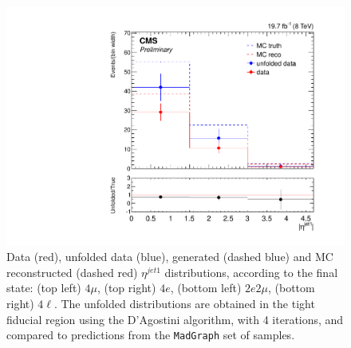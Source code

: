 \begin{figure}[hbtp]
\begin{center}
    \includegraphics[width=\cmsFigWidth]{Figures/EtaJet1_ZZTo4l_Mad_fr}       
    \caption{\footnotesize{Data (red), unfolded data (blue), generated (dashed blue) and MC reconstructed (dashed red) $\eta^{jet1}$ distributions, according to the final state: (top left) $4\mu$, (top right) $4e$, (bottom left) $2e2\mu$, (bottom right) $4\ell$. The unfolded distributions are obtained in the tight fiducial region using the D'Agostini algorithm, with 4 iterations, and compared to predictions from the \texttt{MadGraph} set of samples.}} 
    \label{fig:EtaJet1_unfolding}
  \end{center}
\end{figure}

